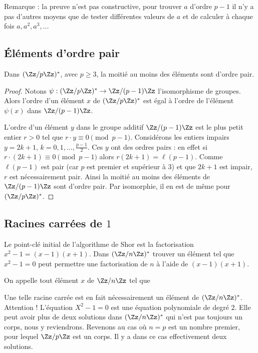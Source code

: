 \documentclass[11pt,class=report,crop=false]{standalone}
\begin{document}
Remarque : la preuve n'est pas constructive, pour trouver $a$ d'ordre $p-1$ il n'y a pas d'autres moyens que de tester différentes valeurs de $a$ et de calculer à chaque fois $a,a^2,a^3,\ldots$

\subsection{\'Eléments d'ordre pair}

\begin{proposition}
\label{prop:ordrezp}
Dans $(\Zz/p\Zz)^*$, avec $p\ge3$, la moitié au moins des éléments sont d'ordre pair.

\end{proposition}

\begin{proof}
Notons $\psi : (\Zz/p\Zz)^* \to \Zz/(p-1)\Zz$ l'isomorphisme de groupes.
Alors l'ordre d'un élément $x$ de $(\Zz/p\Zz)^*$ est égal à l'ordre de l'élément $\psi(x)$ dans $\Zz/(p-1)\Zz$.

L'ordre d'un élément $y$ dans le groupe additif $\Zz/(p-1)\Zz$ est le plus petit entier
$r>0$ tel que $r\cdot y \equiv 0 \pmod{p-1}$.
Considérons les entiers impairs $y=2k+1$, $k=0,1,\ldots,\frac{p-1}{2}$. 
Ces $y$ ont des ordres pairs : en effet si $r\cdot(2k+1) \equiv 0 \pmod {p-1}$
alors $r(2k+1) = \ell(p-1)$. Comme $\ell(p-1)$ est pair (car $p$ est premier et supérieur à $3$) et que $2k+1$ est impair, $r$ est nécessairement pair.
Ainsi la moitié au moins des éléments de $\Zz/(p-1)\Zz$  sont d'ordre pair. Par isomorphie, il en est de même pour $(\Zz/p\Zz)^*$.
\end{proof}


\subsection{Racines carrées de $1$}

Le point-clé initial de l'algorithme de Shor est la factorisation $x^2-1 = (x-1)(x+1)$.
Dans $(\Zz/n\Zz)^*$ trouver un élément tel que $x^2-1=0$ peut permettre une factorisation de $n$ à l'aide de $(x-1)(x+1)$.

\begin{definition}
On appelle  tout élément $x$ de $\Zz/n\Zz$ tel que 
\end{definition}
Une telle racine carrée est en fait nécessairement un élément de $(\Zz/n\Zz)^*$.
Attention ! L'équation $X^2-1=0$ est une équation polynomiale de degré $2$. Elle peut avoir plus de deux solutions dans $(\Zz/n\Zz)^*$ qui n'est pas toujours un corps, nous y reviendrons.
Revenons au cas où $n=p$ est un nombre premier, pour lequel $\Zz/p\Zz$ est un corps.
Il y a dans ce cas effectivement deux solutions.
\end{document}
